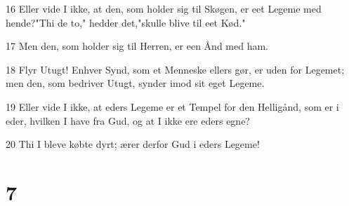 \par 16 Eller vide I ikke, at den, som holder sig til Skøgen, er eet Legeme med hende?"Thi de to," hedder det,"skulle blive til eet Kød."
\par 17 Men den, som holder sig til Herren, er een Ånd med ham.
\par 18 Flyr Utugt! Enhver Synd, som et Menneske ellers gør, er uden for Legemet; men den, som bedriver Utugt, synder imod sit eget Legeme.
\par 19 Eller vide I ikke, at eders Legeme er et Tempel for den Helligånd, som er i eder, hvilken I have fra Gud, og at I ikke ere eders egne?
\par 20 Thi I bleve købte dyrt; ærer derfor Gud i eders Legeme!

\chapter{7}

